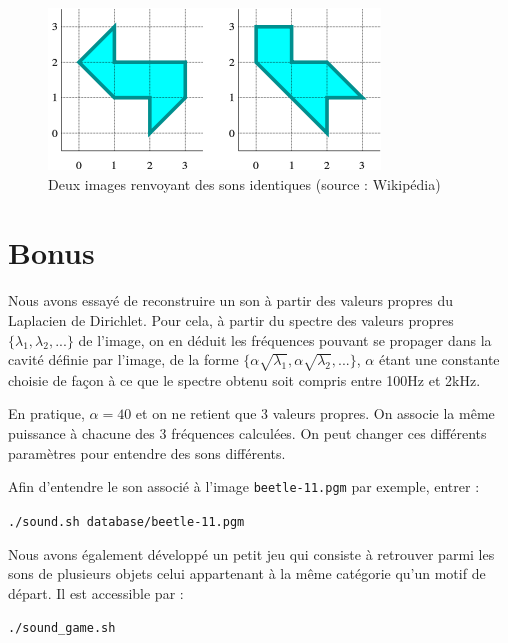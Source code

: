 \documentclass[a4paper,10pt]{article} %
\theoremstyle{definition} %
\begin{document}
\begin{figure}[H]
  \begin{center}
  \includegraphics[scale=0.5]{drums.png}    
  \end{center}
\caption{Deux images renvoyant des sons identiques (source : Wikipédia)}
\label{drum}
\end{figure}

\section*{Bonus}

Nous avons essayé de reconstruire un son à partir des valeurs propres du Laplacien de Dirichlet. Pour cela, à partir du spectre des valeurs propres $\{\lambda_1, \lambda_2, ...\}$ de l'image, on en déduit les fréquences pouvant se propager dans la cavité définie par l'image, de la forme $\{\alpha \sqrt{\lambda_1}, \alpha \sqrt{\lambda_2}, ...\}$, $\alpha$ étant une constante choisie de façon à ce que le spectre obtenu soit compris entre 100Hz et 2kHz.

En pratique, $\alpha = 40$ et on ne retient que 3 valeurs propres. On associe la même puissance à chacune des 3 fréquences calculées. On peut changer ces différents paramètres pour entendre des sons différents.

Afin d'entendre le son associé à l'image \texttt{beetle-11.pgm} par exemple, entrer : 
\begin{center}
  \texttt{./sound.sh database/beetle-11.pgm}
\end{center}

Nous avons également développé un petit jeu qui consiste à retrouver parmi les sons de plusieurs objets celui appartenant à la même catégorie qu'un motif de départ. 
Il est accessible par :
\begin{center}
  \texttt{./sound\_game.sh}
\end{center}




\nocite{*}
\end{document}
